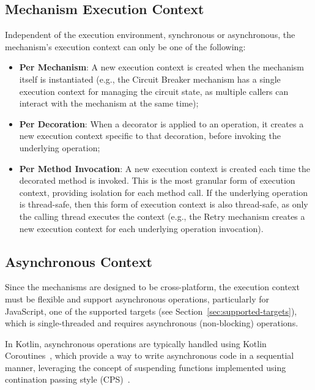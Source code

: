 \subsection{Mechanism Execution Context}\label{subsec:mechanism-execution-context}

Independent of the execution environment, synchronous or asynchronous, the mechanism's execution context can only be one of the following:

\begin{itemize}
    \item \textbf{Per Mechanism}: A new execution context is created when the mechanism itself is instantiated (e.g., the Circuit Breaker mechanism has a single execution context for managing the circuit state, as multiple callers can interact with the mechanism at the same time);
    \item \textbf{Per Decoration}: When a decorator is applied to an operation, it creates a new execution context specific to that decoration, before invoking the underlying operation;
    \item \textbf{Per Method Invocation}: A new execution context is created each time the decorated method is invoked.
    This is the most granular form of execution context, providing isolation for each method call.
    If the underlying operation is thread-safe, then this form of execution context is also thread-safe, as only the calling thread executes the context (e.g., the Retry mechanism creates a new execution context for each underlying operation invocation).
\end{itemize}

\subsection{Asynchronous Context}\label{subsec:asynchronous-context}

Since the mechanisms are designed to be cross-platform, the execution context must be flexible and support asynchronous operations, particularly for JavaScript, one of the supported targets (see Section~\ref{sec:supported-targets}), which is single-threaded and requires asynchronous (non-blocking) operations.

In Kotlin, asynchronous operations are typically handled using Kotlin Coroutines~\cite{kotlin-coroutines},
which provide a way to write asynchronous code in a sequential manner,
leveraging the concept of suspending functions implemented using contination passing style (CPS)~\cite{continuation-passing-style}.


